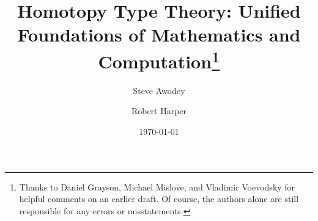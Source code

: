 \documentclass[11pt]{article}
\begin{document}

\title{Homotopy Type Theory: Unified Foundations of Mathematics and Computation\thanks{ Thanks to Daniel Grayson,
    Michael Mislove, and Vladimir Voevodsky for helpful comments on an earlier draft.  Of course, the authors alone are
    still responsible for any errors or misstatements.}  } \author{Steve Awodey \and Robert Harper}
\date{\today}
\maketitle


%   
%  
%  
%   
%   
%   
%     
%
\end{document}
